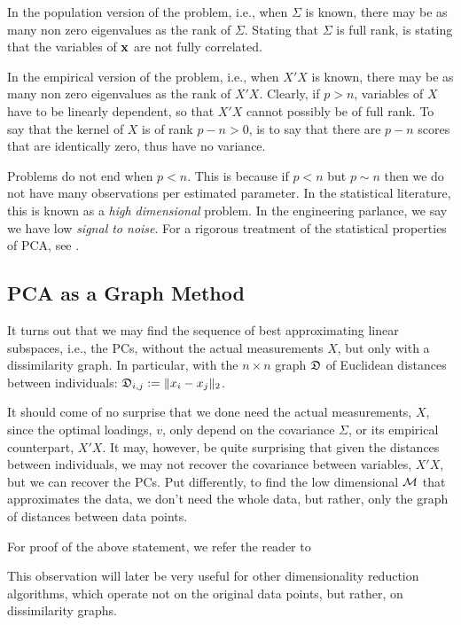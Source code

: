 \documentclass[12pt,a4paper]{article}
\begin{document}
In the population version of the problem, i.e., when $\Sigma$ is known, there may be as many non zero eigenvalues as the rank of $\Sigma$. 
Stating that $\Sigma$ is full rank, is stating that the variables of $\mathbf{x}$ are not fully correlated.

In the empirical version of the problem, i.e., when $X'X$ is known, there may be as many non zero eigenvalues as the rank of $X'X$.
Clearly, if $p>n$, variables of $X$ have to be linearly dependent, so that $X'X$ cannot possibly be of full rank.
To say that the kernel of $X$ is of rank $p-n>0$, is to say that there are $p-n$ scores that are identically zero, thus have no variance. 


Problems do not end when $p<n$. 
This is because if $p<n$ but $p\sim n$ then we do not have many observations per estimated parameter. 
In the statistical literature, this is known as a \emph{high dimensional} problem. 
In the engineering parlance, we say we have low \emph{signal to noise}.
For a rigorous treatment of the statistical properties of PCA, see \cite{nadler2008finite}.
 





\subsection{PCA as a Graph Method}
\label{sec:pca_as_graph}

It turns out that we may find the sequence of best approximating linear subspaces, i.e., the PCs, without the actual measurements $X$, but only with a dissimilarity graph. 
In particular, with the $n\times n$ graph $\mathfrak{D}$ of Euclidean distances between individuals: $\mathfrak{D}_{i,j}:= \Vert x_i-x_j \Vert_2$. 

It should come of no surprise that we done need the actual measurements, $X$, since the optimal loadings, $v$, only depend on the covariance $\Sigma$, or its empirical counterpart, $X'X$. 
It may, however, be quite surprising that given the distances between individuals, we may not recover the covariance between variables, $X'X$, but we can recover the PCs. 
Put differently, to find the low dimensional $\mathcal{M}$ that approximates the data, we don't need the whole data, but rather, only the graph of distances between data points. 

For proof of the above statement, we refer the reader to \cite[Sec.18.5.2]{friedman2001elements}

This observation will later be very useful for other dimensionality reduction algorithms, which operate not on the original data points, but rather, on dissimilarity graphs. 
\end{document}
